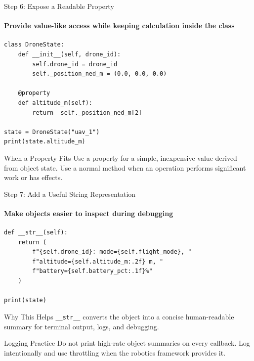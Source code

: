 \begin{frame}[fragile]{Step 6: Expose a Readable Property}
\framesubtitle{Provide value-like access while keeping calculation inside the class}

\begin{verbatim}
class DroneState:
    def __init__(self, drone_id):
        self.drone_id = drone_id
        self._position_ned_m = (0.0, 0.0, 0.0)

    @property
    def altitude_m(self):
        return -self._position_ned_m[2]

state = DroneState("uav_1")
print(state.altitude_m)
\end{verbatim}

\begin{block}{When a Property Fits}
    Use a property for a simple, inexpensive value derived from object state.
    Use a normal method when an operation performs significant work or has effects.
\end{block}
\end{frame}


\begin{frame}[fragile]{Step 7: Add a Useful String Representation}
\framesubtitle{Make objects easier to inspect during debugging}

\begin{verbatim}
def __str__(self):
    return (
        f"{self.drone_id}: mode={self.flight_mode}, "
        f"altitude={self.altitude_m:.2f} m, "
        f"battery={self.battery_pct:.1f}%"
    )

print(state)
\end{verbatim}

\begin{exampleblock}{Why This Helps}
    \texttt{\_\_str\_\_} converts the object into a concise human-readable summary
    for terminal output, logs, and debugging.
\end{exampleblock}

\begin{alertblock}{Logging Practice}
    Do not print high-rate object summaries on every callback. Log intentionally
    and use throttling when the robotics framework provides it.
\end{alertblock}
\end{frame}


